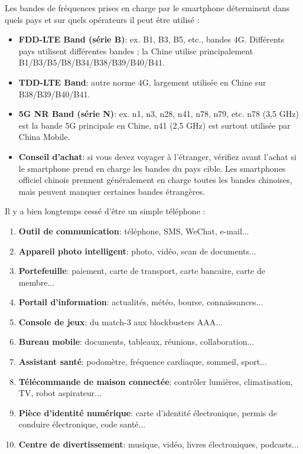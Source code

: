 
Les bandes de fréquences prises en charge par le smartphone déterminent dans quels pays et sur quels opérateurs il peut être utilisé :

\begin{itemize}
  \item \textbf{FDD-LTE Band (série B)}: ex. B1, B3, B5, etc., bandes 4G. Différents pays utilisent différentes bandes ; la Chine utilise principalement B1/B3/B5/B8/B34/B38/B39/B40/B41.
  \item \textbf{TDD-LTE Band}: autre norme 4G, largement utilisée en Chine sur B38/B39/B40/B41.
  \item \textbf{5G NR Band (série N)}: ex. n1, n3, n28, n41, n78, n79, etc. n78 (3,5 GHz) est la bande 5G principale en Chine, n41 (2,5 GHz) est surtout utilisée par China Mobile.
  \item \textbf{Conseil d'achat}: si vous devez voyager à l'étranger, vérifiez avant l'achat si le smartphone prend en charge les bandes du pays cible. Les smartphones officiel chinois prennent généralement en charge toutes les bandes chinoises, mais peuvent manquer certaines bandes étrangères.
\end{itemize}


Il y a bien longtemps cessé d'être un simple téléphone :

\begin{enumerate}
  \item \textbf{Outil de communication}: téléphone, SMS, WeChat, e-mail...
  \item \textbf{Appareil photo intelligent}: photo, vidéo, scan de documents...
  \item \textbf{Portefeuille}: paiement, carte de transport, carte bancaire, carte de membre...
  \item \textbf{Portail d'information}: actualités, météo, bourse, connaissances...
  \item \textbf{Console de jeux}: du match-3 aux blockbusters AAA...
  \item \textbf{Bureau mobile}: documents, tableaux, réunions, collaboration...
  \item \textbf{Assistant santé}: podomètre, fréquence cardiaque, sommeil, sport...
  \item \textbf{Télécommande de maison connectée}: contrôler lumières, climatisation, TV, robot aspirateur...
  \item \textbf{Pièce d'identité numérique}: carte d'identité électronique, permis de conduire électronique, code santé...
  \item \textbf{Centre de divertissement}: musique, vidéo, livres électroniques, podcasts...
\end{enumerate}

